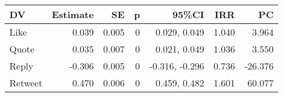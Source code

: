 
\begin{tabular}{lrrrrrr}
\toprule
DV & Estimate & SE & p & 95\%CI & IRR & PC\\
\midrule
Like & 0.039 & 0.005 & 0 & 0.029, 0.049 & 1.040 & 3.964\\
Quote & 0.035 & 0.007 & 0 & 0.021, 0.049 & 1.036 & 3.550\\
Reply & -0.306 & 0.005 & 0 & -0.316, -0.296 & 0.736 & -26.376\\
Retweet & 0.470 & 0.006 & 0 & 0.459, 0.482 & 1.601 & 60.077\\
\bottomrule
\end{tabular}
